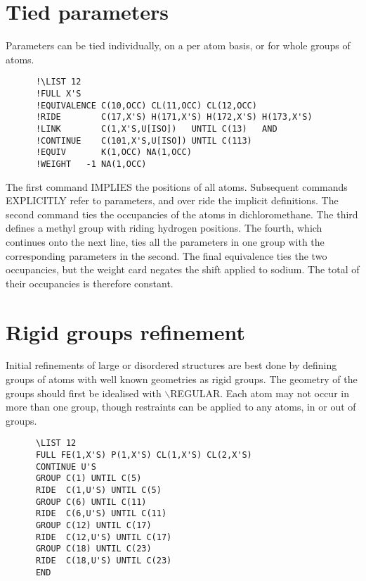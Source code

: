 \documentclass[10pt,a4paper]{report}
\begin{document}
\section{Tied parameters}


Parameters can be tied individually, on a per atom basis, or for whole
 groups of atoms.


\small\begin{verbatim}
      !\LIST 12
      !FULL X'S
      !EQUIVALENCE C(10,OCC) CL(11,OCC) CL(12,OCC)
      !RIDE        C(17,X'S) H(171,X'S) H(172,X'S) H(173,X'S)
      !LINK        C(1,X'S,U[ISO])   UNTIL C(13)   AND
      !CONTINUE    C(101,X'S,U[ISO]) UNTIL C(113)
      !EQUIV       K(1,OCC) NA(1,OCC)
      !WEIGHT   -1 NA(1,OCC)
\end{verbatim}\normalsize




The first command IMPLIES the positions of all atoms. Subsequent commands
 EXPLICITLY refer to parameters, and over ride the implicit definitions. The
 second command
 ties the occupancies of the atoms in dichloromethane. The
 third defines a methyl group with riding hydrogen positions. The fourth,
 which continues onto the next line, ties all the parameters in one group with the
 corresponding parameters in the second. The final equivalence ties the two
 occupancies, but the weight card negates the shift applied to sodium. The
 total of their occupancies is therefore constant.




\section{Rigid groups refinement}


Initial refinements of large or disordered structures are best done by
 defining groups of atoms with well known geometries as rigid groups. The
 geometry of the groups should first be idealised with $\backslash$REGULAR. Each atom
 may not occur in more than one group, though restraints can be applied to
 any atoms, in or out of groups.

\small\begin{verbatim}
      \LIST 12
      FULL FE(1,X'S) P(1,X'S) CL(1,X'S) CL(2,X'S)
      CONTINUE U'S
      GROUP C(1) UNTIL C(5)
      RIDE  C(1,U'S) UNTIL C(5)
      GROUP C(6) UNTIL C(11)
      RIDE  C(6,U'S) UNTIL C(11)
      GROUP C(12) UNTIL C(17)
      RIDE  C(12,U'S) UNTIL C(17)
      GROUP C(18) UNTIL C(23)
      RIDE  C(18,U'S) UNTIL C(23)
      END
\end{verbatim}\normalsize
\end{document}
